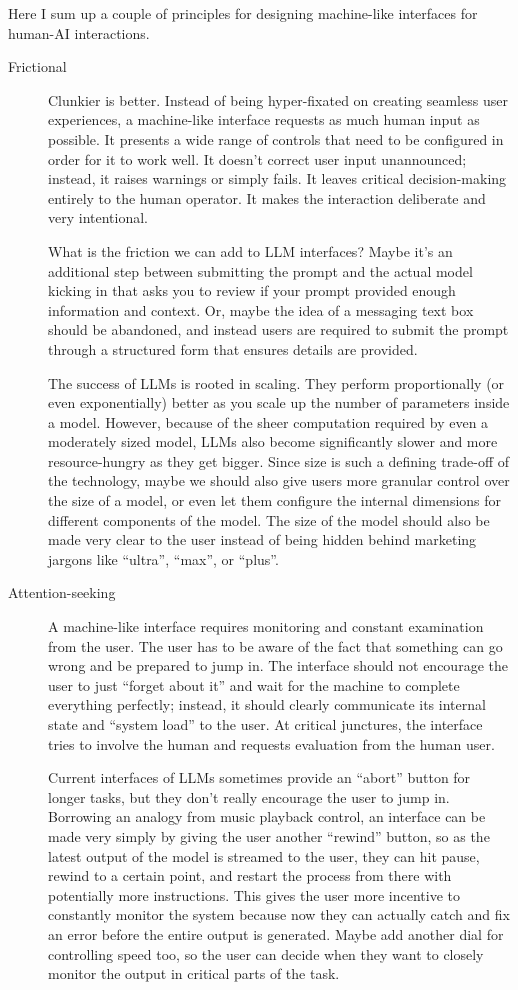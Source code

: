 \documentclass[12pt]{article}
\begin{document}
Here I sum up a couple of principles for designing machine-like interfaces for human-AI interactions.
\begin{description}
    \item[Frictional] Clunkier is better. Instead of being hyper-fixated on creating seamless user experiences, a machine-like interface requests as much human input as possible. It presents a wide range of controls that need to be configured in order for it to work well. It doesn't correct user input unannounced; instead, it raises warnings or simply fails. It leaves critical decision-making entirely to the human operator. It makes the interaction deliberate and very intentional.

    What is the friction we can add to LLM interfaces? Maybe it's an additional step between submitting the prompt and the actual model kicking in that asks you to review if your prompt provided enough information and context. Or, maybe the idea of a messaging text box should be abandoned, and instead users are required to submit the prompt through a structured form that ensures details are provided.

    The success of LLMs is rooted in scaling. They perform proportionally (or even exponentially) better as you scale up the number of parameters inside a model. However, because of the sheer computation required by even a moderately sized model, LLMs also become significantly slower and more resource-hungry as they get bigger. Since size is such a defining trade-off of the technology, maybe we should also give users more granular control over the size of a model, or even let them configure the internal dimensions for different components of the model. The size of the model should also be made very clear to the user instead of being hidden behind marketing jargons like ``ultra'', ``max'', or ``plus''.
    \item[Attention-seeking] A machine-like interface requires monitoring and constant examination from the user. The user has to be aware of the fact that something can go wrong and be prepared to jump in. The interface should not encourage the user to just ``forget about it'' and wait for the machine to complete everything perfectly; instead, it should clearly communicate its internal state and ``system load'' to the user. At critical junctures, the interface tries to involve the human and requests evaluation from the human user. 

    Current interfaces of LLMs sometimes provide an ``abort'' button for longer tasks, but they don't really encourage the user to jump in. Borrowing an analogy from music playback control, an interface can be made very simply by giving the user another ``rewind'' button, so as the latest output of the model is streamed to the user, they can hit pause, rewind to a certain point, and restart the process from there with potentially more instructions. This gives the user more incentive to constantly monitor the system because now they can actually catch and fix an error before the entire output is generated. Maybe add another dial for controlling speed too, so the user can decide when they want to closely monitor the output in critical parts of the task.


\end{description}
\end{document}
